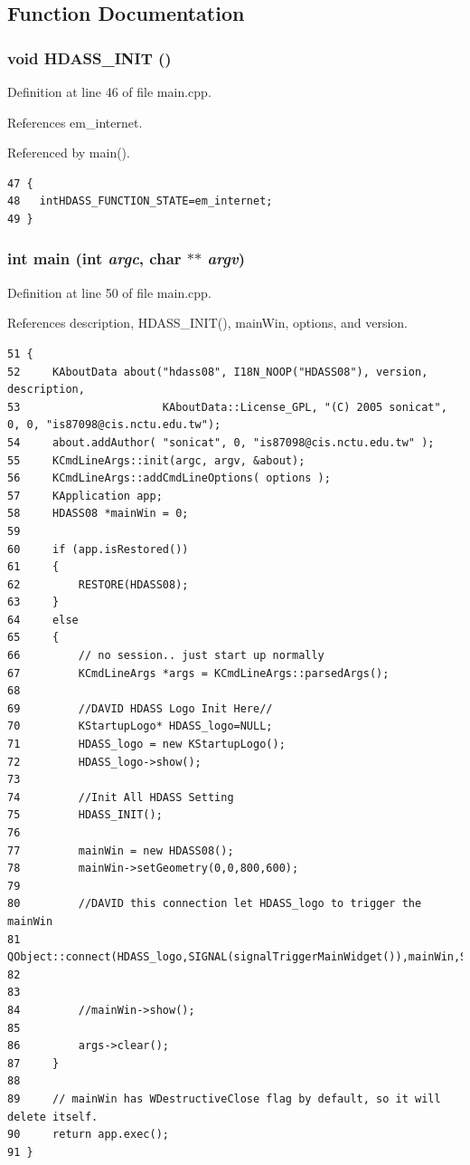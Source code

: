 \subsection{Function Documentation}
\subsubsection{\setlength{\rightskip}{0pt plus 5cm}void HDASS\_\-INIT ()}\label{main_8cpp_a5}




Definition at line 46 of file main.cpp.

References em\_\-internet.

Referenced by main().



\footnotesize\begin{verbatim}47 {
48   intHDASS_FUNCTION_STATE=em_internet;
49 }
\end{verbatim}\normalsize 
{}
\subsubsection{\setlength{\rightskip}{0pt plus 5cm}int main (int {\em argc}, char $\ast$$\ast$ {\em argv})}\label{main_8cpp_a6}




Definition at line 50 of file main.cpp.

References description, HDASS\_\-INIT(), main\-Win, options, and version.



\footnotesize\begin{verbatim}51 {
52     KAboutData about("hdass08", I18N_NOOP("HDASS08"), version, description,
53                      KAboutData::License_GPL, "(C) 2005 sonicat", 0, 0, "is87098@cis.nctu.edu.tw");
54     about.addAuthor( "sonicat", 0, "is87098@cis.nctu.edu.tw" );
55     KCmdLineArgs::init(argc, argv, &about);
56     KCmdLineArgs::addCmdLineOptions( options );
57     KApplication app;
58     HDASS08 *mainWin = 0;
59 
60     if (app.isRestored())
61     {
62         RESTORE(HDASS08);
63     }
64     else
65     {
66         // no session.. just start up normally
67         KCmdLineArgs *args = KCmdLineArgs::parsedArgs();
68 
69         //DAVID HDASS Logo Init Here//
70         KStartupLogo* HDASS_logo=NULL;
71         HDASS_logo = new KStartupLogo();
72         HDASS_logo->show();
73         
74         //Init All HDASS Setting 
75         HDASS_INIT();
76         
77         mainWin = new HDASS08();
78         mainWin->setGeometry(0,0,800,600);
79         
80         //DAVID this connection let HDASS_logo to trigger the mainWin
81         QObject::connect(HDASS_logo,SIGNAL(signalTriggerMainWidget()),mainWin,SLOT(slotShow()));
82         
83  
84         //mainWin->show();
85          
86         args->clear();
87     }
88 
89     // mainWin has WDestructiveClose flag by default, so it will delete itself.
90     return app.exec();
91 }
\end{verbatim}\normalsize 


